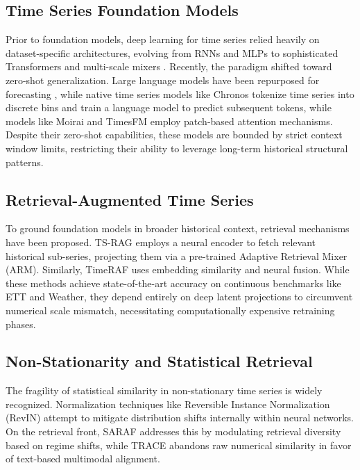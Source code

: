 \documentclass[twocolumn]{svjour3}          %
\begin{document}
\subsection{Time Series Foundation Models}
Prior to foundation models, deep learning for time series relied heavily on dataset-specific architectures, evolving from RNNs \cite{deepar} and MLPs \cite{nbeats} to sophisticated Transformers \cite{informer,autoformer,patchtst,itransformer} and multi-scale mixers \cite{timesnet,timemixer}. Recently, the paradigm shifted toward zero-shot generalization. Large language models have been repurposed for forecasting \cite{llmtime,timellm}, while native time series models like Chronos \cite{chronos} tokenize time series into discrete bins and train a language model to predict subsequent tokens, while models like Moirai \cite{moirai} and TimesFM \cite{timesfm} employ patch-based attention mechanisms. Despite their zero-shot capabilities, these models are bounded by strict context window limits, restricting their ability to leverage long-term historical structural patterns.

\subsection{Retrieval-Augmented Time Series}
To ground foundation models in broader historical context, retrieval mechanisms have been proposed. TS-RAG \cite{tsrag} employs a neural encoder to fetch relevant historical sub-series, projecting them via a pre-trained Adaptive Retrieval Mixer (ARM). Similarly, TimeRAF \cite{timeraf} uses embedding similarity and neural fusion. While these methods achieve state-of-the-art accuracy on continuous benchmarks like ETT and Weather, they depend entirely on deep latent projections to circumvent numerical scale mismatch, necessitating computationally expensive retraining phases.

\subsection{Non-Stationarity and Statistical Retrieval}
The fragility of statistical similarity in non-stationary time series is widely recognized. Normalization techniques like Reversible Instance Normalization (RevIN) \cite{revin} attempt to mitigate distribution shifts internally within neural networks. On the retrieval front, SARAF \cite{saraf} addresses this by modulating retrieval diversity based on regime shifts, while TRACE \cite{trace} abandons raw numerical similarity in favor of text-based multimodal alignment.
\end{document}
